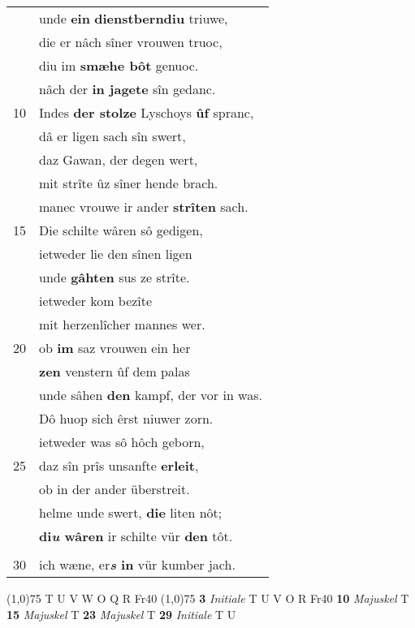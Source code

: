 \documentclass[8pt,a4paper,notitlepage]{article}
\begin{document}
\begin{table}[ht]
\begin{minipage}[t]{0.5\linewidth}
\begin{tabular}{rl}
 & unde \textbf{ein} \textbf{dienstberndiu} triuwe,\\ 
 & die er nâch sîner vrouwen truoc,\\ 
 & diu im \textbf{smæhe bôt} genuoc.\\ 
 & nâch der \textbf{in jagete} sîn gedanc.\\ 
10 & Indes \textbf{der stolze} Lyschoys \textbf{ûf} spranc,\\ 
 & dâ er ligen sach sîn swert,\\ 
 & daz Gawan, der degen wert,\\ 
 & mit strîte ûz sîner hende brach.\\ 
 & manec vrouwe ir ander \textbf{strîten} sach.\\ 
15 & Die schilte wâren sô gedigen,\\ 
 & ietweder lie den sînen ligen\\ 
 & unde \textbf{gâhten} sus ze strîte.\\ 
 & ietweder kom bezîte\\ 
 & mit herzenlîcher mannes wer.\\ 
20 & ob \textbf{im} saz vrouwen ein her\\ 
 & \textbf{zen} venstern ûf dem palas\\ 
 & unde sâhen \textbf{den} kampf, der vor in was.\\ 
 & Dô huop sich êrst niuwer zorn.\\ 
 & ietweder was sô hôch geborn,\\ 
25 & daz sîn prîs unsanfte \textbf{erleit},\\ 
 & ob in der ander überstreit.\\ 
 & helme unde swert, \textbf{die} liten nôt;\\ 
 & \textbf{di\textit{u} wâren} ir schilte vür \textbf{den} tôt.\\ 
 & \textit{\begin{large}S\end{large}}wer \textbf{die} helde strîten sach,\\ 
30 & ich wæne, er\textbf{\textit{s} in} vür kumber jach.\\ 
\end{tabular}
\scriptsize
\line(1,0){75} \newline
T U V W O Q R Fr40 \newline
\line(1,0){75} \newline
\textbf{3} \textit{Initiale} T U V O R Fr40  \textbf{10} \textit{Majuskel} T  \textbf{15} \textit{Majuskel} T  \textbf{23} \textit{Majuskel} T  \textbf{29} \textit{Initiale} T U  \newline

\end{minipage}
\end{table}
\end{document}
